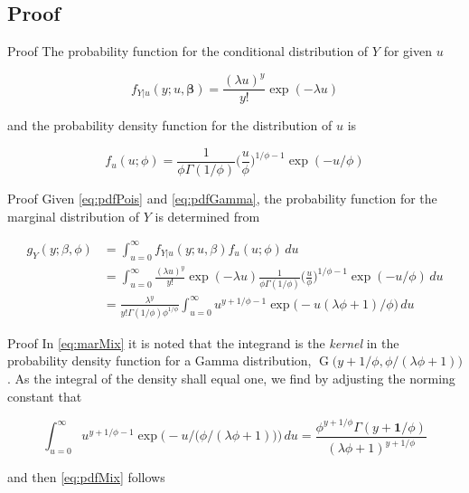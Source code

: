 \documentclass[aspectratio=169]{beamer}
\DeclareMathOperator{\G}{G}
\begin{document}
\hypertarget{proof}{%
\subsection{Proof}\label{proof}}

\begin{frame}{Proof}
The probability function for the conditional distribution of \(Y\) for
given \(u\)

\begin{equation}\label{eq:pdfPois}
  f_{Y|u}(y;u,\boldsymbol{\beta})=\frac{(\lambda u)^{y}}{y!}\exp(-\lambda u)
\end{equation}

and the probability density function for the distribution of \(u\) is

\begin{equation} \label{eq:pdfGamma}
  f_{u}(u;\phi)=\frac{1}{\phi \Gamma(1/\phi)} \bigg(\frac{u}{\phi}\bigg)^{1/\phi-1} \exp (-u/\phi)
\end{equation}
\end{frame}

\begin{frame}{Proof}
\protect\hypertarget{proof-1}{}
Given \eqref{eq:pdfPois} and \eqref{eq:pdfGamma}, the probability
function for the marginal distribution of \(Y\) is determined from

\begin{equation} \label{eq:marMix}
  \begin{aligned}
    g_{Y}(y;\beta,\phi)&=\int_{u=0}^\infty f_{Y|u}(y;u,\beta) f_{u}(u;\phi) \,du \\
    &=\int_{u=0}^\infty \frac{(\lambda u)^y}{y!} \exp (-\lambda u) \frac{1}{\phi \Gamma(1/\phi)} \bigg(\frac{u}{\phi}\bigg)^{1/\phi-1} \exp (-u /\phi) \,du\\
    &=\frac{\lambda^{y}}{y!\Gamma(1/\phi)\phi^{1/\phi}} \int_{u=0}^\infty u^{y+1/\phi-1} \exp \big(-u(\lambda \phi+1)/\phi\big) \,du
  \end{aligned}
\end{equation}
\end{frame}

\begin{frame}{Proof}
\protect\hypertarget{proof-2}{}
In \eqref{eq:marMix} it is noted that the integrand is the \emph{kernel}
in the probability density function for a Gamma distribution,
\(\G\big(y+1/\phi,\phi/(\lambda \phi+1)\big)\). As the integral of the
density shall equal one, we find by adjusting the norming constant that

\begin{equation}
  \int_{u=0}^\infty  u^{ y+ 1/\phi-1} \exp \Big(- u/\big(\phi/( \lambda \phi+1)\big)\Big) \,du = \frac{\phi^{ y+ 1/\phi}\Gamma( y+\boldsymbol 1/\phi)}{( \lambda \phi + 1)^{y+1/\phi}}
\end{equation}

and then \eqref{eq:pdfMix} follows
\end{frame}
\end{document}
